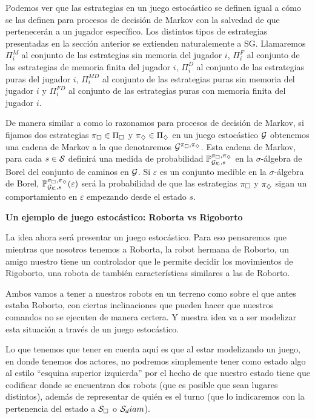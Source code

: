Podemos ver que las estrategias en un juego estocástico se definen igual a cómo
se las definen para procesos de decisión de Markov con la salvedad de que
pertenecerán a un jugador específico. Los distintos tipos de estrategias
presentadas en la sección anterior se extienden naturalemente a SG. Llamaremos
$\Pi^{M}_i$ al conjunto de las estrategias sin memoria del jugador $i$,
$\Pi^{F}_i$ al conjunto de las estrategias de memoria finita del jugador $i$,
$\Pi^{D}_i$ al conjunto de las estrategias puras del jugador $i$, $\Pi^{MD}_i$
al conjunto de las estrategias puras sin memoria del jugador $i$ y $\Pi^{FD}_i$
al conjunto de las estrategias puras con memoria finita del jugador $i$.

De manera similar a como lo razonamos para procesos de decisión de Markov, si
fijamos dos estrategias $\pi_\square \in \Pi_\square$ y $\pi_\diamondsuit \in \Pi_\diamondsuit$
en un juego estocástico $\mathcal{G}$ obtenemos una cadena de Markov a la que
denotaremos $\mathcal{G}^{\pi_\square, \pi_\diamondsuit}$. Esta cadena de Markov, para cada $s \in
	\mathcal{S}$ definirá una medida de probabilidad $\mathbb{P}_{\mathcal{G}_{\mathcal{K}}, s}^{\pi_\square, \pi_\diamondsuit}$ en la $\sigma$-álgebra de
Borel del conjunto de caminos en $\mathcal{G}$. Si $\varepsilon$ es un conjunto medible
en la $\sigma$-álgebra de Borel, $\mathbb{P}_{\mathcal{G}_{\mathcal{K}}, s}^{\pi_\square, \pi_\diamondsuit}(\varepsilon)$ será la probabilidad de
que las estrategias $\pi_\square$ y $\pi_\diamondsuit$ sigan un comportamiento en
$\varepsilon$ empezando desde el estado $s$.

\textbf{Un ejemplo de juego estocástico: Roborta vs Rigoborto}

La idea ahora será presentar un juego estocástico. Para eso pensaremos que
mientras que nosotros tenemos a Roborta, la robot hermana de Roborto, un amigo
nuestro tiene un controlador que le permite decidir los movimientos de
Rigoborto, una robota de también características similares a las de Roborto.

Ambos vamos a tener a nuestros robots en un terreno como sobre el que antes
estaba Roborto, con ciertas inclinaciones que pueden hacer que nuestros
comandos no se ejecuten de manera certera. Y nuestra idea va a ser modelizar
esta situación a través de un juego estocástico.

Lo que tenemos que tener en cuenta aquí es que al estar modelizando un juego,
en donde tenemos dos actores, no podremos simplemente tener como estado algo al
estilo ``esquina superior izquierda'' por el hecho de que nuestro estado tiene
que codificar donde se encuentran dos robots (que es posible que sean lugares
distintos), además de representar de quién es el turno (que lo indicaremos con
la pertenencia del estado a $\mathcal{S}_\square$ o $\mathcal{S}_diam$).

